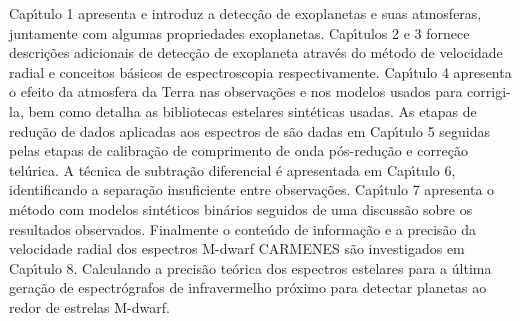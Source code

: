 \begin{abstract-pt}
    Cap\'{\i}tulo 1 apresenta e introduz a detec\c{c}\~{a}o de exoplanetas e suas atmosferas, juntamente com algumas propriedades exoplanetas.
    Cap\'{\i}tulos 2 e 3 fornece descri\c{c}\~{o}es adicionais de detec\c{c}\~{a}o de exoplaneta atrav\'{e}s do m\'{e}todo de velocidade radial e conceitos b\'{a}sicos de \nir{} espectroscopia respectivamente.
    Cap\'{\i}tulo 4 apresenta o efeito da atmosfera da Terra nas observa\c{c}\~{o}es e nos modelos usados para corrigi-la, bem como detalha as bibliotecas estelares sint\'{e}ticas usadas.
    As etapas de redu\c{c}\~{a}o de dados aplicadas aos espectros de \nir{} s\~{a}o dadas em Cap\'{\i}tulo 5 seguidas pelas etapas de calibra\c{c}\~{a}o de comprimento de onda p\'{o}s-redu\c{c}\~{a}o e corre\c{c}\~{a}o tel\'{u}rica.
    A t\'{e}cnica de subtra\c{c}\~{a}o diferencial \'{e} apresentada em Cap\'{\i}tulo 6, identificando a separa\c{c}\~{a}o insuficiente entre observa\c{c}\~{o}es.
    Cap\'{\i}tulo 7 apresenta o m\'{e}todo \textchisquared{} com modelos sint\'{e}ticos bin\'{a}rios seguidos de uma discuss\~{a}o sobre os resultados observados.
    Finalmente o \nir{} conte\'{u}do de informa\c{c}\~{a}o e a precis\~{a}o da velocidade radial dos espectros {M-dwarf} {CARMENES} s\~{a}o investigados em Cap\'{\i}tulo 8.
    Calculando a precis\~{a}o te\'{o}rica dos espectros estelares para a \'{u}ltima gera\c{c}\~{a}o de espectr\'{o}grafos de infravermelho pr\'{o}ximo para detectar planetas ao redor de estrelas {M-dwarf}.
\end{abstract-pt}
